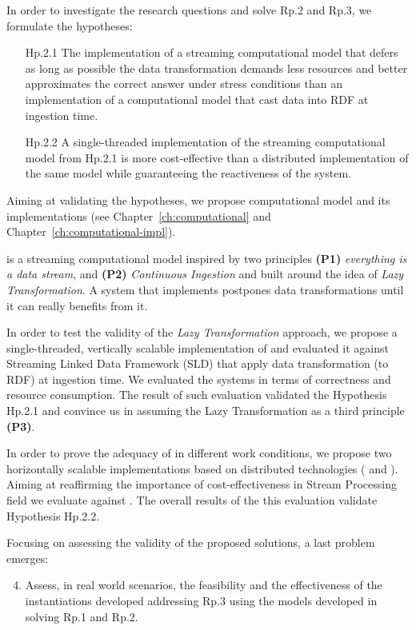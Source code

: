 In order to investigate the research questions and solve \textsf{Rp.2} and \textsf{Rp.3}, we formulate the hypotheses: 
\begin{itemize}[leftmargin=42pt]
\item[\textsf{Hp.2.1}] The implementation of a streaming computational model that defers as long as possible the data transformation demands less resources and better approximates the correct answer under stress conditions than an implementation of a computational model that cast data into RDF at ingestion time.
\item[\textsf{Hp.2.2}] A single-threaded implementation of the streaming computational model from \textsf{Hp.2.1} is more cost-effective than a distributed implementation of the same model while guaranteeing the reactiveness of the system.
\end{itemize}

Aiming at validating the hypotheses, we propose \river{} computational model and its implementations (see Chapter~\ref{ch:computational} and Chapter~\ref{ch:computational-impl}).

\river{} is a streaming computational model inspired by two principles \textbf{(P1)} \textit{everything is a data stream}, and \textbf{(P2)} \textit{Continuous Ingestion} and built around the idea of \textit{Lazy Transformation}.
A system that implements \river{} postpones data transformations until it can really benefits from it.

In order to test the validity of the \textit{Lazy Transformation} approach, we propose \sti{} a single-threaded, vertically scalable implementation of \river{} and evaluated it against Streaming Linked Data Framework (SLD) that  apply data transformation (to RDF) at ingestion time.
We evaluated the systems in terms of correctness and resource consumption.
The result of such evaluation validated the Hypothesis \textsf{Hp.2.1} and convince us in assuming the \textsf{Lazy Transformation} as a third principle \textbf{(P3)}.

In order to prove the adequacy of \river{} in different work conditions, we propose two horizontally scalable implementations based on distributed technologies (\sparkdi{} and \hivedi{}).
Aiming at reaffirming the importance of cost-effectiveness in Stream Processing field we evaluate \sti{} against \sparkdi{}.
The overall results of the this evaluation validate Hypothesis \textsf{Hp.2.2}.

Focusing on assessing the validity of the proposed solutions, a last problem emerges:
\begin{enumerate}[leftmargin=32pt,label=\textsf{Rp.\arabic*}]
\setcounter{enumi}{3}
\item Assess, in real world scenarios, the feasibility and the effectiveness of the instantiations developed addressing \textsf{Rp.3} using the models developed in solving \textsf{Rp.1} and \textsf{Rp.2}.
\end{enumerate}

